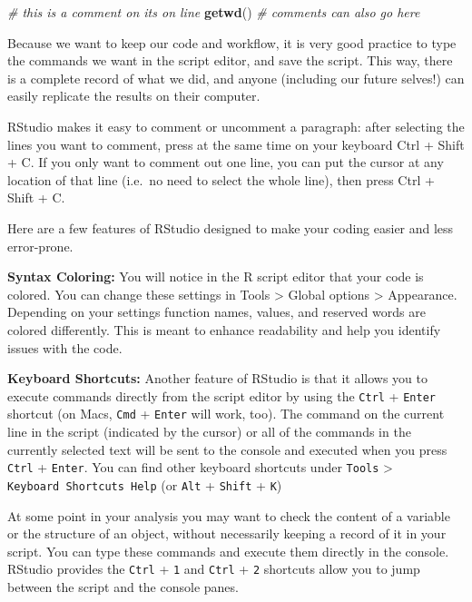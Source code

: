 \documentclass[
]{book}
\newenvironment{Shaded}{\begin{snugshade}}{\end{snugshade}}
\newcommand{\CommentTok}[1]{\textcolor[rgb]{0.56,0.35,0.01}{\textit{#1}}}
\newcommand{\FunctionTok}[1]{\textcolor[rgb]{0.13,0.29,0.53}{\textbf{#1}}}
\newcommand{\NormalTok}[1]{#1}
\begin{document}
\begin{Shaded}
\begin{Highlighting}[]
\CommentTok{\# this is a comment on its on line}
\FunctionTok{getwd}\NormalTok{() }\CommentTok{\# comments can also go here}
\end{Highlighting}
\end{Shaded}

Because we want to keep our code and workflow, it is very good practice to type
the commands we want in the script editor, and save the script. This way, there
is a complete record of what we did, and anyone (including our future selves!)
can easily replicate the results on their computer.

RStudio makes it easy to comment or uncomment a paragraph: after selecting the
lines you want to comment, press at the same time on your keyboard
Ctrl + Shift + C. If you only want to comment
out one line, you can put the cursor at any location of that line (i.e.~no need
to select the whole line), then press Ctrl + Shift +
C.

Here are a few features of RStudio designed to make your coding easier and less error-prone.

\textbf{Syntax Coloring:} You will notice in the R script editor that your code is colored. You can change these settings in Tools \textgreater{} Global options \textgreater{} Appearance. Depending on your settings function names, values, and reserved words are colored differently. This is meant to
enhance readability and help you identify issues with the code.

\textbf{Keyboard Shortcuts:} Another feature of RStudio is that it allows you to execute commands directly from the script editor by using
the \texttt{Ctrl} + \texttt{Enter} shortcut (on Macs, \texttt{Cmd} +
\texttt{Enter} will work, too). The command on the current line in the
script (indicated by the cursor) or all of the commands in the currently
selected text will be sent to the console and executed when you press
\texttt{Ctrl} + \texttt{Enter}. You can find other keyboard shortcuts under \texttt{Tools} \textgreater{} \texttt{Keyboard\ Shortcuts\ Help} (or \texttt{Alt} + \texttt{Shift} + \texttt{K})

At some point in your analysis you may want to check the content of a variable
or the structure of an object, without necessarily keeping a record of it in
your script. You can type these commands and execute them directly in the
console. RStudio provides the \texttt{Ctrl} + \texttt{1} and
\texttt{Ctrl} + \texttt{2} shortcuts allow you to jump between the
script and the console panes.
\end{document}
